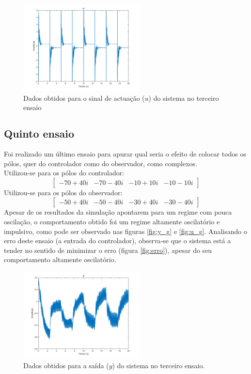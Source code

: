 \documentclass[%
  reprint,
  nofootinbib,
  amsmath,amssymb,
  aps,
  10pt,
  a4paper
]{revtex4-1}
\begin{document}
\begin{figure}
\includegraphics[width=2.5in]{../imgs/dados_00_f/dados_00_f_u.png}
\caption{Dados obtidos para o sinal de actuação ($u$) do sistema no terceiro ensaio}
\label{fig:u_f}
\end{figure}
\subsection{Quinto ensaio}
Foi realizado um último ensaio para apurar qual seria o efeito de colocar todos os pólos, quer do controlador como do observador, como complexos.\\
Utilizou-se para os pólos do controlador:
\begin{equation}
\begin{bmatrix}
-70+40i & -70-40i & -10+10i &-10-10i
\end{bmatrix}
\end{equation}
Utilizou-se para os pólos do observador:
\begin{equation}
\begin{bmatrix}
-50+40i & -50-40i & -30+40i &-30-40i
\end{bmatrix}
\end{equation}
Apesar de os resultados da simulação apontarem para um regime com pouca oscilação, o comportamento obtido foi um regime altamente oscilatório e impulsivo, como pode ser observado nas figuras \ref{fig:y_g} e \ref{fig:u_g}.
Analisando o erro deste ensaio (a entrada do controlador), observa-se que o sistema está a tender no sentido de minimizar o erro (figura \ref{fig:erro}), apesar do seu comportamento altamente oscilatório.
\begin{figure}
\includegraphics[width=2.5in]{../imgs/dados_00_g/dados_00_g_y.png}
\caption{Dados obtidos para a saída ($y$) do sistema no terceiro ensaio.}
\label{fig:y_f}
\end{figure}
\end{document}
